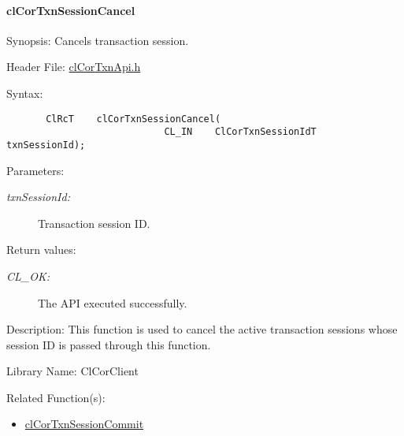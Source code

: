 \hypertarget{pagecor503}{}\paragraph{cl\-Cor\-Txn\-Session\-Cancel}\label{pagecor503}
\begin{Desc}
\item[Synopsis:]Cancels transaction session.\end{Desc}
\begin{Desc}
\item[Header File:]\hyperlink{cl_cor_txn_api_8h}{cl\-Cor\-Txn\-Api.h}\end{Desc}
\begin{Desc}
\item[Syntax:]

\footnotesize\begin{verbatim}       ClRcT    clCorTxnSessionCancel(
                            CL_IN    ClCorTxnSessionIdT  txnSessionId); 
\end{verbatim}
\normalsize
\end{Desc}
\begin{Desc}
\item[Parameters:]
\begin{description}
\item[{\em txn\-Session\-Id:}]Transaction session ID.\end{description}
\end{Desc}
\begin{Desc}
\item[Return values:]
\begin{description}
\item[{\em CL\_\-OK:}]The API executed successfully.\end{description}
\end{Desc}
\begin{Desc}
\item[Description:]This function is used to cancel the active transaction sessions whose session ID is passed through this function.\end{Desc}
\begin{Desc}
\item[Library Name:]Cl\-Cor\-Client\end{Desc}
\begin{Desc}
\item[Related Function(s):]\begin{itemize}
\item \hyperlink{group__group13}{cl\-Cor\-Txn\-Session\-Commit}\end{itemize}
\end{Desc}
